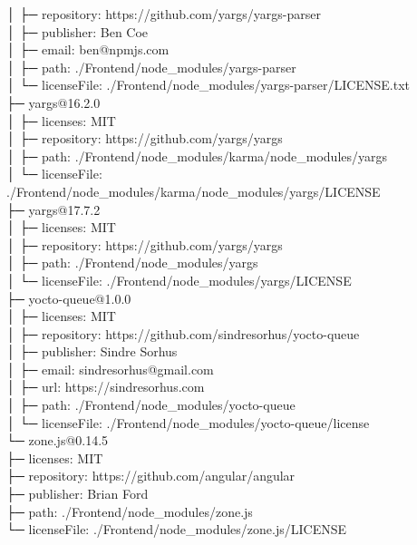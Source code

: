 \documentclass[
    paper=a4,
    twoside=false,
    parskip=half,
    listof=entryprefix,
    listof=totoc,
    index=totoc,
    bibliography=totoc,
    headsepline,
]{scrbook}
\begin{document}
    │  ├─ repository: https://github.com/yargs/yargs-parser\\
    │  ├─ publisher: Ben Coe\\
    │  ├─ email: ben@npmjs.com\\
    │  ├─ path: ./Frontend/node\_modules/yargs-parser\\
    │  └─ licenseFile: ./Frontend/node\_modules/yargs-parser/LICENSE.txt\\
    ├─ yargs@16.2.0\\
    │  ├─ licenses: MIT\\
    │  ├─ repository: https://github.com/yargs/yargs\\
    │  ├─ path: ./Frontend/node\_modules/karma/node\_modules/yargs\\
    │  └─ licenseFile: ./Frontend/node\_modules/karma/node\_modules/yargs/LICENSE\\
    ├─ yargs@17.7.2\\
    │  ├─ licenses: MIT\\
    │  ├─ repository: https://github.com/yargs/yargs\\
    │  ├─ path: ./Frontend/node\_modules/yargs\\
    │  └─ licenseFile: ./Frontend/node\_modules/yargs/LICENSE\\
    ├─ yocto-queue@1.0.0\\
    │  ├─ licenses: MIT\\
    │  ├─ repository: https://github.com/sindresorhus/yocto-queue\\
    │  ├─ publisher: Sindre Sorhus\\
    │  ├─ email: sindresorhus@gmail.com\\
    │  ├─ url: https://sindresorhus.com\\
    │  ├─ path: ./Frontend/node\_modules/yocto-queue\\
    │  └─ licenseFile: ./Frontend/node\_modules/yocto-queue/license\\
    └─ zone.js@0.14.5\\
    ├─ licenses: MIT\\
    ├─ repository: https://github.com/angular/angular\\
    ├─ publisher: Brian Ford\\
    ├─ path: ./Frontend/node\_modules/zone.js\\
    └─ licenseFile: ./Frontend/node\_modules/zone.js/LICENSE\\
\end{document}
